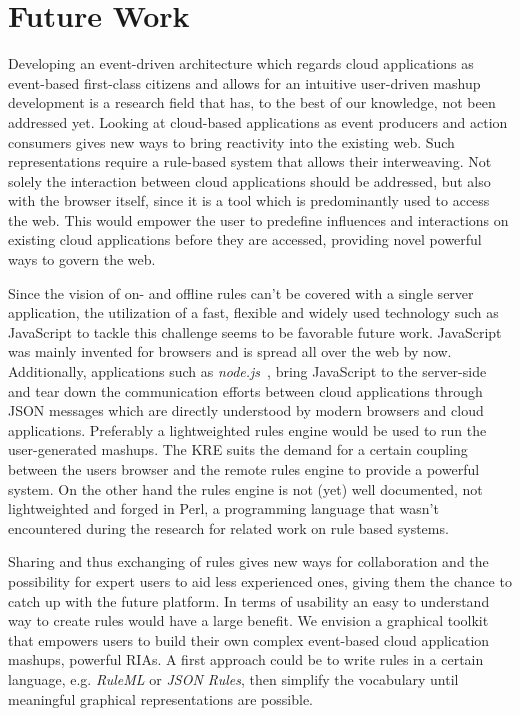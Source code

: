\documentclass[11pt]{article}%
\begin{document}
\section{Future Work}
Developing an event-driven architecture which regards cloud applications as event-based first-class citizens and allows for an intuitive user-driven mashup development is a research field that has, to the best of our knowledge, not been addressed yet. Looking at cloud-based applications as event producers and action consumers gives new ways to bring reactivity into the existing web. Such representations require a rule-based system that allows their interweaving. Not solely the interaction between cloud applications should be addressed, but also with the browser itself, since it is a tool which is predominantly used to access the web. This would empower the user to predefine influences and interactions on existing cloud applications before they are accessed, providing novel powerful ways to govern the web.

Since the vision of on- and offline rules can't be covered with a single server application, the utilization of a fast, flexible and widely used technology such as JavaScript to tackle this challenge seems to be favorable future work. JavaScript was mainly invented for browsers and is spread all over the web by now. Additionally, applications such as \emph{node.js}~\cite{wwwnodejs}, bring JavaScript to the server-side and tear down the communication efforts between cloud applications through JSON messages which are directly understood by modern browsers and cloud applications.
Preferably a lightweighted rules engine would be used to run the user-generated mashups. The KRE suits the demand for a certain coupling between the users browser and the remote rules engine to provide a powerful system. On the other hand the rules engine is not (yet) well documented, not lightweighted and forged in Perl, a programming language that wasn't encountered during the research for related work on rule based systems.

Sharing and thus exchanging of rules gives new ways for collaboration and the possibility for expert users to aid less experienced ones, giving them the chance to catch up with the future platform. 
In terms of usability an easy to understand way to create rules would have a large benefit. We envision a graphical toolkit that empowers users to build their own complex event-based cloud application mashups, powerful RIAs.
A first approach could be to write rules in a certain language, e.g. \emph{RuleML} or \emph{JSON Rules}, then simplify the vocabulary until meaningful graphical representations are possible.
\end{document}
